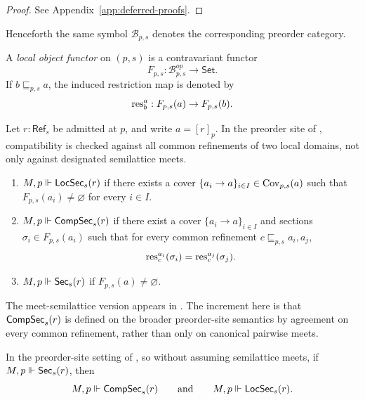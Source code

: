 \begin{proof}
See Appendix~\ref{app:deferred-proofs}.
\end{proof}

Henceforth the same symbol $\mathcal{B}_{p,s}$ denotes the corresponding preorder category.

\begin{definition}\label{def:local-object-functor}
A \emph{local object functor} on $(p,s)$ is a contravariant functor
\[
F_{p,s}:\mathcal{B}_{p,s}^{op}\to\mathsf{Set}.
\]
If $b\sqsubseteq_{p,s} a$, the induced restriction map is denoted by
\[
\mathrm{res}_b^a:F_{p,s}(a)\to F_{p,s}(b).
\]
\end{definition}

\begin{definition}\label{def:existence-levels}
Let $r:\mathsf{Ref}_s$ be admitted at $p$, and write $a=[r]_p$.
In the preorder site of , compatibility is checked against all common refinements of two local domains, not only against designated semilattice meets.
\begin{enumerate}[label=(\roman*),nosep]
\item $M,p\Vdash \mathsf{LocSec}_s(r)$ if there exists a cover $\{a_i\to a\}_{i\in I}\in\mathrm{Cov}_{p,s}(a)$ such that $F_{p,s}(a_i)\neq\varnothing$ for every $i\in I$.
\item $M,p\Vdash \mathsf{CompSec}_s(r)$ if there exist a cover $\{a_i\to a\}_{i\in I}$ and sections $\sigma_i\in F_{p,s}(a_i)$ such that for every common refinement $c\sqsubseteq_{p,s} a_i,a_j$,
\[
\mathrm{res}_c^{a_i}(\sigma_i)=\mathrm{res}_c^{a_j}(\sigma_j).
\]
\item $M,p\Vdash \mathsf{Sec}_s(r)$ if $F_{p,s}(a)\neq\varnothing$.
\end{enumerate}
\end{definition}

\begin{remark}
The meet-semilattice version appears in \cite[Definition~4.5]{MaZhang2026ConditionalGluingFailure}. The increment here is that $\mathsf{CompSec}_s(r)$ is defined on the broader preorder-site semantics by agreement on every common refinement, rather than only on canonical pairwise meets.
\end{remark}

\begin{proposition}\label{prop:global-implies-compatible-local}
In the preorder-site setting of , so without assuming semilattice meets, if $M,p\Vdash \mathsf{Sec}_s(r)$, then
\[
M,p\Vdash \mathsf{CompSec}_s(r)
\qquad\text{and}\qquad
M,p\Vdash \mathsf{LocSec}_s(r).
\]
\end{proposition}

